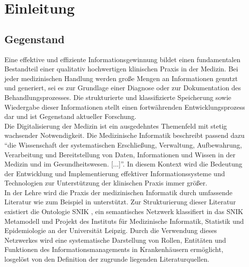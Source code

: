 \chapter{Einleitung}\label{ch:introduction}
\section{Gegenstand}\label{sec:gegenstand}
Eine effektive und effiziente Informationsgewinnung bildet einen fundamentalen Bestandteil einer qualitativ hochwertigen klinischen Praxis in der Medizin. 
Bei jeder medizinischen Handlung werden große Mengen an Informationen genutzt und generiert, sei es zur Grundlage einer Diagnose oder zur Dokumentation des Behandlungsprozesses. 
Die strukturierte und klassifizierte Speicherung sowie Wiedergabe dieser Informationen stellt einen fortwährenden Entwicklungsprozess dar und ist Gegenstand aktueller Forschung.\\

Die Digitalisierung der Medizin ist ein ausgedehntes Themenfeld mit stetig wachsender Notwendigkeit. 
Die Medizinische Informatik beschreibt passend dazu \enquote{die Wissenschaft der systematischen Erschließung, Verwaltung, Aufbewahrung, Verarbeitung und Bereitstellung von Daten, Informationen und Wissen in der Medizin und im Gesundheitswesen. [...]}\citep{gmds}. 
In diesem Kontext wird die Bedeutung der Entwicklung und Implementierung effektiver Informationssysteme und Technologien zur Unterstützung der klinischen Praxis immer größer.\\

In der Lehre wird die Praxis der medizinischen Informatik durch umfassende Literatur wie zum Beispiel in \citet{bb} unterstützt. 
Zur Strukturierung dieser Literatur existiert die Ontologie SNIK \citep{snikgraphposter}, ein semantisches Netzwerk klassifiert in das SNIK Metamodell und Projekt des Instituts für Medizinische Informatik, Statistik und Epidemiologie \citep{imise} an der Universität Leipzig.
Durch die Verwendung dieses Netzwerkes wird eine systematische Darstellung von Rollen, Entitäten und Funktionen des Informationsmanagements in Krankenhäusern ermöglicht, losgelöst von den Definition der zugrunde liegenden Literaturquellen.\\

